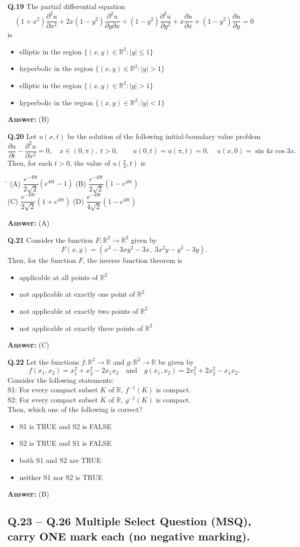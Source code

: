 \documentclass[11pt,a4paper]{article}
\newcommand{\optsfourA}[4]{%
  \begin{tabbing}
    \hspace{0.48\linewidth}\=\kill
    (A) #1 \> (B) #2 \\[2pt]
    (C) #3 \> (D) #4
  \end{tabbing}%
}
\newcommand{\optslistA}[4]{%
  \begin{itemize}
    \setlength{\itemsep}{2pt}\setlength{\parskip}{0pt}
    \item[(A)] #1
    \item[(B)] #2
    \item[(C)] #3
    \item[(D)] #4
  \end{itemize}%
}
\newcommand{\ans}[1]{\textbf{Answer:} #1\par\medskip}
\begin{document}
\textbf{Q.19} The partial differential equation
\[
  (1 + x^2) \frac{\partial^2 u}{\partial x^2} + 2x(1 - y^2) \frac{\partial^2 u}{\partial y \partial x} + (1 - y^2) \frac{\partial^2 u}{\partial y^2} + x \frac{\partial u}{\partial x} + (1 - y^2) \frac{\partial u}{\partial y} = 0
\]
is
\optslistA{elliptic in the region $\{(x, y) \in \mathbb{R}^2 : |y| \le 1\}$}{hyperbolic in the region $\{(x, y) \in \mathbb{R}^2 : |y| > 1\}$}{elliptic in the region $\{(x, y) \in \mathbb{R}^2 : |y| > 1\}$}{hyperbolic in the region $\{(x, y) \in \mathbb{R}^2 : |y| < 1\}$}
\ans{(B)}

\textbf{Q.20} Let $u(x, t)$ be the solution of the following initial-boundary value problem
\[
  \frac{\partial u}{\partial t} - \frac{\partial^2 u}{\partial x^2} = 0, \quad x \in (0, \pi), \; t > 0, \qquad u(0, t) = u(\pi, t) = 0, \quad u(x, 0) = \sin 4x \cos 3x.
\]
Then, for each $t > 0$, the value of $u\!\left(\frac{\pi}{4}, t\right)$ is
\optsfourA{$\dfrac{e^{-49t}}{2\sqrt{2}}(e^{48t} - 1)$}{$\dfrac{e^{-49t}}{2\sqrt{2}}(1 - e^{48t})$}{$\dfrac{e^{-49t}}{2\sqrt{2}}(1 + e^{48t})$}{$\dfrac{e^{-49t}}{4\sqrt{2}}(1 - e^{48t})$}
\ans{(A)}

\textbf{Q.21} Consider the function $F : \mathbb{R}^2 \to \mathbb{R}^2$ given by
\[
  F(x, y) = (x^3 - 3xy^2 - 3x, \; 3x^2 y - y^3 - 3y).
\]
Then, for the function $F$, the inverse function theorem is
\optslistA{applicable at all points of $\mathbb{R}^2$}{not applicable at exactly one point of $\mathbb{R}^2$}{not applicable at exactly two points of $\mathbb{R}^2$}{not applicable at exactly three points of $\mathbb{R}^2$}
\ans{(C)}

\textbf{Q.22} Let the functions $f : \mathbb{R}^2 \to \mathbb{R}$ and $g : \mathbb{R}^2 \to \mathbb{R}$ be given by
\[
  f(x_1, x_2) = x_1^2 + x_2^2 - 2x_1 x_2 \quad \text{and} \quad g(x_1, x_2) = 2x_1^2 + 2x_2^2 - x_1 x_2.
\]
Consider the following statements:\\
S1: For every compact subset $K$ of $\mathbb{R}$, $f^{-1}(K)$ is compact.\\
S2: For every compact subset $K$ of $\mathbb{R}$, $g^{-1}(K)$ is compact.\\
Then, which one of the following is correct?
\optslistA{S1 is TRUE and S2 is FALSE}{S2 is TRUE and S1 is FALSE}{both S1 and S2 are TRUE}{neither S1 nor S2 is TRUE}
\ans{(B)}

\subsection*{Q.23 -- Q.26 Multiple Select Question (MSQ), carry ONE mark each (no negative marking).}
\end{document}
